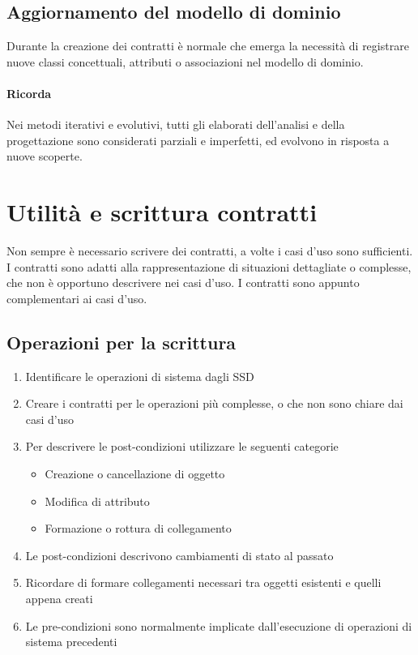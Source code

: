 \subsection{Aggiornamento del modello di dominio}
Durante la creazione dei contratti è normale che emerga la necessità di registrare nuove classi concettuali,
attributi o associazioni nel modello di dominio.
\paragraph*{Ricorda} Nei metodi iterativi e evolutivi, tutti gli elaborati dell'analisi e della progettazione
sono considerati parziali e imperfetti, ed evolvono in risposta a nuove scoperte.
\section{Utilità e scrittura contratti}
Non sempre è necessario scrivere dei contratti, a volte i casi d'uso sono sufficienti.
I contratti sono adatti alla rappresentazione di situazioni dettagliate o complesse, che non è opportuno
descrivere nei casi d'uso. I contratti sono appunto complementari ai casi d'uso.
\subsection*{Operazioni per la scrittura}
\begin{enumerate}
    \item Identificare le operazioni di sistema dagli SSD
    \item Creare i contratti per le operazioni più complesse, o che non sono chiare dai casi d'uso
    \item Per descrivere le post-condizioni utilizzare le seguenti categorie \begin{itemize}
        \item Creazione o cancellazione di oggetto
        \item Modifica di attributo
        \item Formazione o rottura di collegamento
    \end{itemize}
    \item Le post-condizioni descrivono cambiamenti di stato al passato
    \item Ricordare di formare collegamenti necessari tra oggetti esistenti e quelli appena creati
    \item Le pre-condizioni sono normalmente implicate dall'esecuzione di operazioni di sistema precedenti
\end{enumerate}
